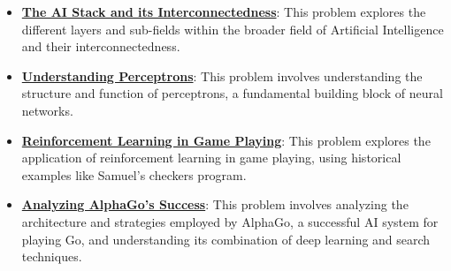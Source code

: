 \documentclass{article}%
\begin{document}
\begin{itemize}[leftmargin=*]
\item \href{https://purdue.brightspace.com/d2l/common/assets/pdfjs-d2l-dist/1.0.14-legacy/web/viewer.html?file=\%2Fcontent\%2Fenforced\%2F1095467-wl.202510.CS.24300.001\%2F02L2-Intro.pdf\%3Fou\%3D1095467\&lang=en-us\&container=d2l-fileviewer-rendered-pdf\&fullscreen=d2l-fileviewer-rendered-pdf-dialog\&height=667#page=44}{\textbf{The AI Stack and its Interconnectedness}}: This problem explores the different layers and sub{-}fields within the broader field of Artificial Intelligence and their interconnectedness.%
\item \href{https://purdue.brightspace.com/d2l/common/assets/pdfjs-d2l-dist/1.0.14-legacy/web/viewer.html?file=\%2Fcontent\%2Fenforced\%2F1095467-wl.202510.CS.24300.001\%2F02L2-Intro.pdf\%3Fou\%3D1095467\&lang=en-us\&container=d2l-fileviewer-rendered-pdf\&fullscreen=d2l-fileviewer-rendered-pdf-dialog\&height=667#page=45}{\textbf{Understanding Perceptrons}}: This problem involves understanding the structure and function of perceptrons, a fundamental building block of neural networks.%
\item \href{https://purdue.brightspace.com/d2l/common/assets/pdfjs-d2l-dist/1.0.14-legacy/web/viewer.html?file=\%2Fcontent\%2Fenforced\%2F1095467-wl.202510.CS.24300.001\%2F02L2-Intro.pdf\%3Fou\%3D1095467\&lang=en-us\&container=d2l-fileviewer-rendered-pdf\&fullscreen=d2l-fileviewer-rendered-pdf-dialog\&height=667#page=46}{\textbf{Reinforcement Learning in Game Playing}}: This problem explores the application of reinforcement learning in game playing, using historical examples like Samuel's checkers program.%
\item \href{https://purdue.brightspace.com/d2l/common/assets/pdfjs-d2l-dist/1.0.14-legacy/web/viewer.html?file=\%2Fcontent\%2Fenforced\%2F1095467-wl.202510.CS.24300.001\%2F02L2-Intro.pdf\%3Fou\%3D1095467\&lang=en-us\&container=d2l-fileviewer-rendered-pdf\&fullscreen=d2l-fileviewer-rendered-pdf-dialog\&height=667#page=50}{\textbf{Analyzing AlphaGo's Success}}: This problem involves analyzing the architecture and strategies employed by AlphaGo, a successful AI system for playing Go, and understanding its combination of deep learning and search techniques.%
\end{itemize}%
\end{document}
